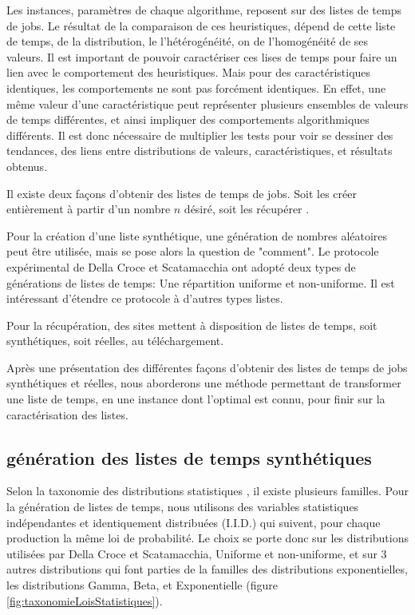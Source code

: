 \documentclass[a4paper,12pt]{report}
\theoremstyle{plain}				%
\theoremstyle{definition}				%
\begin{document}
Les instances, paramètres de chaque algorithme, reposent sur des listes de temps de jobs.
Le résultat de la comparaison de ces heuristiques, dépend de cette liste de temps, de la distribution, le l'hétérogénéité, on de l'homogénéité de ses valeurs. 
Il est important de pouvoir caractériser ces lises de temps pour faire un lien avec le comportement des heuristiques. 
Mais pour des caractéristiques identiques, les comportements ne sont pas forcément identiques. 
En effet, une même valeur d'une caractéristique peut représenter plusieurs ensembles de valeurs de temps différentes, et ainsi impliquer des comportements algorithmiques différents. 
Il est donc nécessaire de multiplier les tests pour voir se dessiner des tendances, des liens entre distributions de valeurs, caractéristiques, et résultats obtenus.

Il existe deux façons d'obtenir des listes de temps de jobs. 
Soit les créer entièrement à partir d'un nombre $n$ désiré, soit les récupérer .

Pour la création d'une liste synthétique, une génération de nombres aléatoires peut être utilisée, 
  mais se pose alors la question de "comment". 
Le protocole expérimental de Della Croce et Scatamacchia ont adopté  
  deux types de générations de listes de temps: 
  Une répartition uniforme et non-uniforme.
Il est intéressant d'étendre ce protocole à d'autres types listes.

Pour la récupération, des sites mettent à disposition de listes de temps, soit synthétiques, soit réelles, au téléchargement. 
  
\bigskip
Après une présentation des différentes façons d'obtenir des listes de temps de jobs synthétiques et réelles, nous aborderons une méthode permettant de transformer une liste de temps, en une instance dont l'optimal est connu, pour finir sur la caractérisation des listes.  

\subsection{génération des listes de temps synthétiques}\label{ssec:instancesGenerationListesTempsSynthetiques}

Selon la taxonomie des distributions statistiques \cite{nielsen2009statistical}, il existe plusieurs familles. 
Pour la génération de listes de temps, nous utilisons 
  des variables statistiques indépendantes et identiquement distribuées 
  (I.I.D.) qui suivent, pour chaque production la même loi de probabilité.
Le choix se porte donc sur les distributions utilisées 
  par Della Croce et Scatamacchia, Uniforme et non-uniforme, 
  et sur 3 autres distributions qui font parties de la familles 
  des distributions exponentielles, les distributions Gamma, Beta, et Exponentielle 
  (figure \ref{fig:taxonomieLoisStatistiques}).
\end{document}

